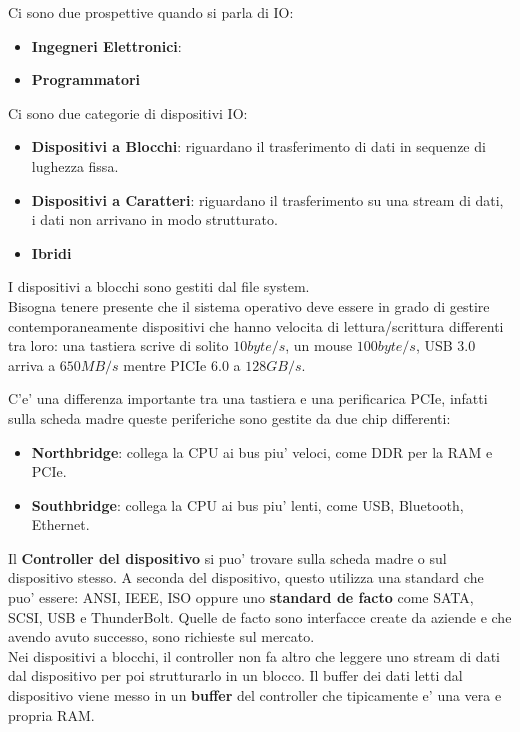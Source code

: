 Ci sono due prospettive quando si parla di IO:
\begin{itemize}
    \item \textbf{Ingegneri Elettronici}:
    \item  \textbf{Programmatori}
\end{itemize}

Ci sono due categorie di dispositivi IO:
\begin{itemize}
    \item \textbf{Dispositivi a Blocchi}: riguardano il trasferimento di dati in sequenze di lughezza fissa.
    \item \textbf{Dispositivi a Caratteri}: riguardano il trasferimento su una stream di dati, i dati non arrivano in modo strutturato.
    \item \textbf{Ibridi}
\end{itemize}

I dispositivi a blocchi sono gestiti dal file system.  \\
Bisogna tenere presente che il sistema operativo deve essere in grado di gestire
contemporaneamente dispositivi che hanno velocita di lettura/scrittura differenti tra loro:
una tastiera scrive di solito $10byte/s$, un mouse $100byte/s$, USB 3.0 arriva a $650MB/s$ mentre 
PICIe 6.0 a $128GB/s$.

C'e' una differenza importante tra una tastiera e una perificarica PCIe, infatti sulla scheda madre
queste periferiche sono gestite da due chip differenti:
\begin{itemize}
    \item \textbf{Northbridge}: collega la CPU ai bus piu' veloci, come DDR per la RAM e PCIe.
    \item \textbf{Southbridge}: collega la CPU ai bus piu' lenti, come USB, Bluetooth, Ethernet.
\end{itemize}

Il \textbf {Controller del dispositivo} si puo' trovare sulla scheda madre o sul dispositivo stesso.
A seconda del dispositivo, questo utilizza una standard che puo' essere: ANSI, IEEE, ISO oppure 
uno \textbf{standard de facto} come SATA, SCSI, USB e ThunderBolt. Quelle de facto sono interfacce create
da aziende e che avendo avuto successo, sono richieste sul mercato. \\

Nei dispositivi a blocchi, il controller non fa altro che leggere uno stream di dati dal dispositivo 
per poi strutturarlo in un blocco. Il buffer dei dati letti dal dispositivo viene 
messo in un \textbf{buffer} del controller che tipicamente e' una vera e propria RAM.

